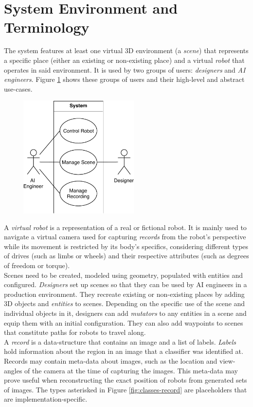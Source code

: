 \section{System Environment and Terminology}
The system features at least one virtual 3D environment (a \emph{scene}) that represents a specific place (either an existing or non-existing place) and a virtual \emph{robot} that operates in said environment. It is used by two groups of users: \emph{designers} and \emph{\ac{AI} engineers}. Figure \ref{fig:use-cases-abstract} shows these groups of users and their high-level and abstract use-cases.
\begin{figure}[t]
    \centering
    \includegraphics[width=6cm]{tex/img/ch04/UseCases_HighLevel.pdf}
    \label{fig:use-cases-abstract}
\end{figure}
A \emph{virtual robot} is a representation of a real or fictional robot. It is mainly used to navigate a virtual camera used for capturing \emph{records} from the robot's perspective while its movement is restricted by its body's specifics, considering different types of drives (such as limbs or wheels) and their respective attributes (such as degrees of freedom or torque).\\
Scenes need to be created, modeled using geometry, populated with entities and configured. \emph{Designers} set up scenes so that they can be used by \acs{AI} engineers in a production environment. They recreate existing or non-existing places by adding 3D objects and \emph{entities} to scenes. Depending on the specific use of the scene and individual objects in it, designers can add \emph{mutators} to any entities in a scene and equip them with an initial configuration. They can also add waypoints to scenes that constitute paths for robots to travel along.\\
A \emph{record} is a data-structure that contains an image and a list of labels. \emph{Labels} hold information about the region in an image that a classifier was identified at. Records may contain meta-data about images, such as the location and view-angles of the camera at the time of capturing the images. This meta-data may prove useful when reconstructing the exact position of robots from generated sets of images. The types asterisked in Figure \ref{fig:classes-record} are placeholders that are implementation-specific.
